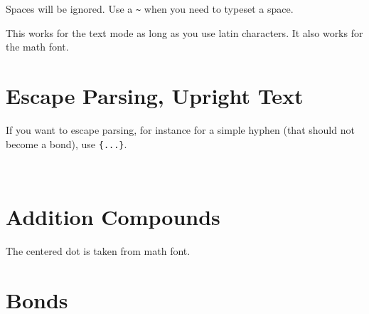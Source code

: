 \documentclass[a4paper,notitlepage,parskip=half]{scrreprt}
\begin{document}
Spaces will be ignored. Use a \verb|~| when you need to typeset a space.

This works for the text mode as long as you use latin characters. It also works for the math font.


\section{Escape Parsing, Upright Text}

If you want to escape parsing, for instance for a simple hyphen (that should not become a bond), use \verb|{...}|.

\begin{SideBySideExample}[xrightmargin=4cm]
  \\
  \sffamily\bfseries
\end{SideBySideExample}


\section{Addition Compounds}

\begin{SideBySideExample}[xrightmargin=5cm]
\end{SideBySideExample}

\begin{SideBySideExample}[xrightmargin=5cm]
\end{SideBySideExample}

\begin{SideBySideExample}[xrightmargin=5cm]
\end{SideBySideExample}

The centered dot is taken from math font.


\section{Bonds}

\begin{SideBySideExample}[xrightmargin=3cm]
\end{SideBySideExample}

\begin{SideBySideExample}[xrightmargin=3cm]
\end{SideBySideExample}

\begin{SideBySideExample}[xrightmargin=3cm]
  \sffamily\bfseries
\end{SideBySideExample}
\end{document}
